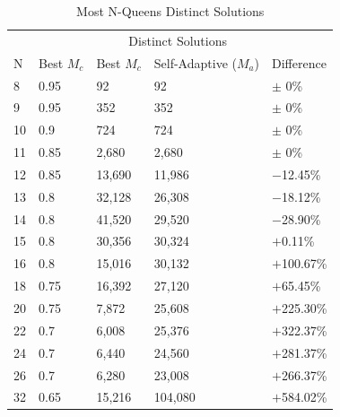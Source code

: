 \documentclass[conference]{IEEEtran}
\begin{document}
\begin{table}
\centering
\caption{Most N-Queens Distinct Solutions}
\begin{tabular}{|l|l|l|l|l|} \hline
&               &  \multicolumn{2}{c|}{Distinct Solutions}& \\ \cline{3-4}
N&  Best $M_{c}$&  Best $M_{c}$&    Self-Adaptive ($M_{a}$)&    Difference\\ \hline
8&  0.95&          92&              92&                         $\pm$ 0\% \\ \hline                        
9&  0.95&          352&             352&                        $\pm$ 0\% \\ \hline
10& 0.9&           724&             724&                        $\pm$ 0\% \\ \hline
11& 0.85&          2,680&           2,680&                      $\pm$ 0\% \\ \hline
12& 0.85&          13,690&          11,986&                     $-$12.45\% \\ \hline
13& 0.8&           32,128&          26,308&                     $-$18.12\% \\ \hline
14& 0.8&           41,520&          29,520&                     $-$28.90\% \\ \hline
15& 0.8&           30,356&          30,324&                     $+$0.11\% \\ \hline
16& 0.8&           15,016&          30,132&                     $+$100.67\% \\ \hline
18& 0.75&          16,392&          27,120&                     $+$65.45\% \\ \hline
20& 0.75&          7,872&           25,608&                     $+$225.30\% \\ \hline
22& 0.7&           6,008&           25,376&                     $+$322.37\% \\ \hline
24& 0.7&           6,440&           24,560&                     $+$281.37\% \\ \hline
26& 0.7&           6,280&           23,008&                     $+$266.37\% \\ \hline
32& 0.65&          15,216&          104,080&                    $+$584.02\% \\ \hline
\end{tabular}
\label{table:mostsol}
\end{table}
\end{document}
